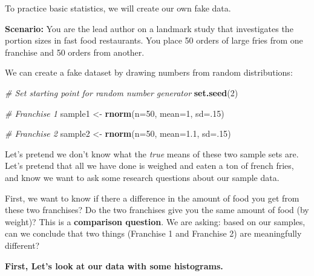 \documentclass[
]{book}
\newenvironment{Shaded}{\begin{snugshade}}{\end{snugshade}}
\newcommand{\CommentTok}[1]{\textcolor[rgb]{0.56,0.35,0.01}{\textit{#1}}}
\newcommand{\DataTypeTok}[1]{\textcolor[rgb]{0.13,0.29,0.53}{#1}}
\newcommand{\DecValTok}[1]{\textcolor[rgb]{0.00,0.00,0.81}{#1}}
\newcommand{\FloatTok}[1]{\textcolor[rgb]{0.00,0.00,0.81}{#1}}
\newcommand{\KeywordTok}[1]{\textcolor[rgb]{0.13,0.29,0.53}{\textbf{#1}}}
\newcommand{\NormalTok}[1]{#1}
\newcommand{\StringTok}[1]{\textcolor[rgb]{0.31,0.60,0.02}{#1}}
\begin{document}
To practice basic statistics, we will create our own fake data.

\textbf{Scenario:} You are the lead author on a landmark study that investigates the portion sizes in fast food restaurants. You place 50 orders of large fries from one franchise and 50 orders from another.

We can create a fake dataset by drawing numbers from random distributions:

\begin{Shaded}
\begin{Highlighting}[]
\CommentTok{# Set starting point for random number generator}
\KeywordTok{set.seed}\NormalTok{(}\DecValTok{2}\NormalTok{)}

\CommentTok{# Franchise 1}
\NormalTok{sample1 <-}\StringTok{ }\KeywordTok{rnorm}\NormalTok{(}\DataTypeTok{n=}\DecValTok{50}\NormalTok{, }\DataTypeTok{mean=}\DecValTok{1}\NormalTok{, }\DataTypeTok{sd=}\NormalTok{.}\DecValTok{15}\NormalTok{)}

\CommentTok{# Franchise 2}
\NormalTok{sample2 <-}\StringTok{ }\KeywordTok{rnorm}\NormalTok{(}\DataTypeTok{n=}\DecValTok{50}\NormalTok{, }\DataTypeTok{mean=}\FloatTok{1.1}\NormalTok{, }\DataTypeTok{sd=}\NormalTok{.}\DecValTok{15}\NormalTok{)}
\end{Highlighting}
\end{Shaded}

Let's pretend we don't know what the \emph{true} means of these two sample sets are. Let's pretend that all we have done is weighed and eaten a ton of french fries, and know we want to ask some research questions about our sample data.

First, we want to know if there a difference in the amount of food you get from these two franchises? Do the two franchises give you the same amount of food (by weight)? This is a \textbf{comparison question}. We are asking: based on our samples, can we conclude that two things (Franchise 1 and Franchise 2) are meaningfully different?

\textbf{First, Let's look at our data with some histograms.}
\end{document}
